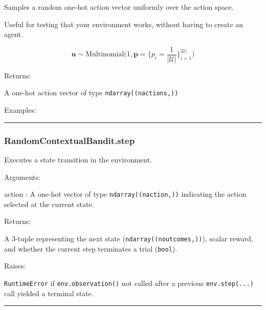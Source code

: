 \begin{Shaded}
\begin{Highlighting}[]
\NormalTok{)}
\end{Highlighting}
\end{Shaded}

Samples a random one-hot action vector uniformly over the action space.

Useful for testing that your environment works, without having to create
an agent.

\[
\mathbf u \sim \mathrm{Multinomial}\Big(1, \mathbf p=\{p_i = \frac{1}{|\mathcal U|}\}_{i=1}^{|\mathcal U|}\Big)
\]

Returns:

A one-hot action vector of type \texttt{ndarray((nactions,))}

Examples:

\begin{Shaded}
\begin{Highlighting}[]
\OperatorTok{=}
\end{Highlighting}
\end{Shaded}

\begin{center}\rule{0.5\linewidth}{\linethickness}\end{center}

\hypertarget{randomcontextualbandit.step}{%
\subsubsection{RandomContextualBandit.step}\label{randomcontextualbandit.step}}

\begin{Shaded}
\begin{Highlighting}[]
\end{Highlighting}
\end{Shaded}

Executes a state transition in the environment.

Arguments:

action : A one-hot vector of type \texttt{ndarray((naction,))}
indicating the action selected at the current state.

Returns:

A 3-tuple representing the next state (\texttt{ndarray((noutcomes,))}),
scalar reward, and whether the current step terminates a trial
(\texttt{bool}).

Raises:

\texttt{RuntimeError} if \texttt{env.observation()} not called after a
previous \texttt{env.step(...)} call yielded a terminal state.

\begin{center}\rule{0.5\linewidth}{\linethickness}\end{center}
